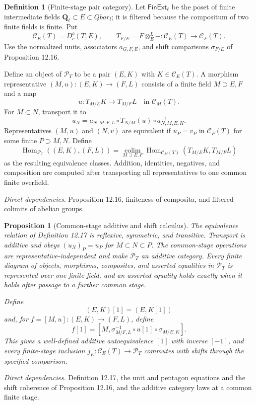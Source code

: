 \documentclass[10pt]{article}
\newtheorem{proposition}[theorem]{Proposition}
\theoremstyle{definition}
\newtheorem{definition}[theorem]{Definition}
\newcommand{\Hom}{\operatorname{Hom}}
\newcommand{\colim}{\operatorname*{colim}}
\newcommand{\Ql}{\mathbf Q_\ell}
\newcommand{\Qlb}{\overline{\mathbf Q}_\ell}
\newcommand{\Dbc}{D^b_c}
\newcommand{\deps}[1]{\par\smallskip\textit{Direct dependencies.} #1\par}
\def\Qlb{Qbar_l}%
\begin{document}
\begin{definition}[Finite-stage pair category]
Let $\mathsf{FinExt}_\ell$ be the poset of finite intermediate fields
$\Ql\subset E\subset\Qlb$; it is filtered because the compositum of two
finite fields is finite.  Put
\[
 \mathcal C_E(T)=\Dbc(T,E),
 \qquad T_{F/E}=F\otimes_E^L-:\mathcal C_E(T)\to\mathcal C_F(T).
\]
Use the normalized units, associators $a_{G,F,E}$, and shift comparisons
$\sigma_{F/E}$ of Proposition 12.16.

Define an object of $\mathcal P_T$ to be a pair $(E,K)$ with
$K\in\mathcal C_E(T)$.  A morphism representative
$(M,u):(E,K)\to(F,L)$ consists of a finite field $M\supset E,F$ and a map
\[
 u:T_{M/E}K\longrightarrow T_{M/F}L
 \quad\text{in }\mathcal C_M(T).
\]
For $M\subset N$, transport it to
\[
 u_N=
 a_{N,M,F,L}\circ T_{N/M}(u)\circ a_{N,M,E,K}^{-1}.
\]
Representatives $(M,u)$ and $(N,v)$ are equivalent if $u_P=v_P$ in
$\mathcal C_P(T)$ for some finite $P\supset M,N$.  Define
\[
 \Hom_{\mathcal P_T}((E,K),(F,L))
 =\colim_{M\supset E,F}
 \Hom_{\mathcal C_M(T)}(T_{M/E}K,T_{M/F}L)
\]
as the resulting equivalence classes.  Addition, identities, negatives,
and composition are computed after transporting all representatives to one
common finite overfield.
\end{definition}
\deps{Proposition 12.16, finiteness of composita, and filtered colimits of
abelian groups.}

\begin{proposition}[Common-stage additive and shift calculus]
The equivalence relation of Definition 12.17 is reflexive, symmetric, and
transitive.  Transport is additive and obeys $(u_N)_P=u_P$ for
$M\subset N\subset P$.  The common-stage operations are
representative-independent and make $\mathcal P_T$ an additive category.
Every finite diagram of objects, morphisms, composites, and asserted
equalities in $\mathcal P_T$ is represented over one finite field, and an
asserted equality holds exactly when it holds after passage to a further
common stage.

Define
\[
 (E,K)[1]=(E,K[1])
\]
and, for $f=[M,u]:(E,K)\to(F,L)$, define
\[
 f[1]=\left[M,
 \sigma_{M/F,L}^{-1}\circ u[1]\circ\sigma_{M/E,K}\right].
\]
This gives a well-defined additive autoequivalence $[1]$ with inverse
$[-1]$, and every finite-stage inclusion
$j_E:\mathcal C_E(T)\to\mathcal P_T$ commutes with shifts through the
specified comparison.
\end{proposition}
\deps{Definition 12.17, the unit and pentagon equations and the shift
coherence of Proposition 12.16, and the additive category laws at a common
finite stage.}
\end{document}
